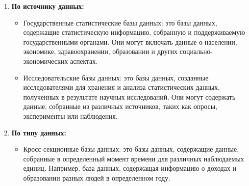 \begin{enumerate}
    \item \textbf{По источнику данных:} \begin{itemize}
        \item Государственные статистические базы данных: это базы данных, содержащие статистическую информацию, собранную и поддерживаемую государственными органами. Они могут включать данные о населении, экономике, здравоохранении, образовании и других социально-экономических аспектах.
        \item Исследовательские базы данных: это базы данных, созданные исследователями для хранения и анализа статистических данных, полученных в результате научных исследований. Они могут содержать данные, собранные из различных источников, таких как опросы, эксперименты или наблюдения.
    \end{itemize}
    \item \textbf{По типу данных:} \begin{itemize}
        \item Кросс-секционные базы данных: это базы данных, содержащие данные, собранные в определенный момент времени для различных наблюдаемых единиц. Например, база данных, содержащая информацию о доходах и образовании разных людей в определенном году.


\end{itemize}
\end{enumerate}
